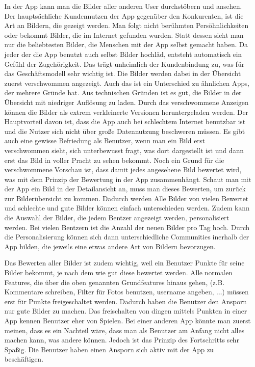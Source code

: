 In der App kann man die Bilder aller anderen User durchstöbern und ansehen. Der hauptsächliche Kundennutzen der App gegenüber den Konkurenten, ist die Art an Bildern, die gezeigt werden. Man folgt nicht berühmten Persöhnlichkeiten oder bekommt Bilder, die im Internet gefunden wurden. Statt dessen sieht man nur die beliebtesten Bilder, die Menschen mit der App selbst gemacht haben. Da jeder der die App benutzt auch selbst Bilder hochläd, entsteht automatisch ein Gefühl der Zugehörigkeit. Das trägt unheimlich der Kundenbindung zu, was für das Geschäftsmodell sehr wichtig ist.
Die Bilder werden dabei in der Übersicht zuerst verschwommen angezeigt. Auch das ist ein Unterschied zu ähnlichen Apps, der mehrere Gründe hat. Aus technischen Gründen ist es gut, die Bilder in der Übersicht mit niedriger Auflösung zu laden. Durch das verschwommene Anzeigen können die Bilder als extrem verkleinerte Versionen heruntergeladen werden. Der Hauptvorteil davon ist, dass die App auch bei schlechtem Internet benutzbar ist und die Nutzer sich nicht über große Datennutzung beschweren müssen. Es gibt auch eine gewisse Befriedung als Benutzer, wenn man ein Bild erst verschwommen sieht, sich unterbewusst fragt, was dort dargestellt ist und dann erst das Bild in voller Pracht zu sehen bekommt. Noch ein Grund für die verschwommene Vorschau ist, dass damit jedes angesehene Bild bewertet wird, was mit dem Prinzip der Bewertung in der App zusammenhängt.
Schaut man mit der App ein Bild in der Detailansicht an, muss man dieses Bewerten, um zurück zur Bilderübersicht zu kommen. Dadurch werden Alle Bilder von vielen Bewertet und schlechte und gute Bilder können einfach unterschieden werden. Zudem kann die Auswahl der Bilder, die jedem Bentzer angezeigt werden, personalisiert werden. Bei vielen Bentzern ist die Anzahl der neuen Bilder pro Tag hoch. Durch die Personalisierung können sich dann unterschiedliche Communities inerhalb der App bilden, die jeweils eine etwas andere Art von Bildern bevorzugen.

Das Bewerten aller Bilder ist zudem wichtig, weil ein Benutzer Punkte für seine Bilder bekommt, je nach dem wie gut diese bewertet werden. Alle normalen Features, die über die oben genannten Grundfeatures hinaus gehen, (z.B. Kommentare schreiben, Filter für Fotos benutzen, username angeben, ...) müssen erst für Punkte freigeschaltet werden. Dadurch haben die Benutzer den Ansporn nur gute Bilder zu machen.
Das freischalten von dingen mittels Punkten in einer App kennen Benutzer eher von Spielen. Bei einer anderen App könnte man zuerst meinen, dass es ein Nachteil wäre, dass man als Benutzer am Anfang nicht alles machen kann, was andere können. Jedoch ist das Prinzip des Fortschritts sehr Spaßig. Die Benutzer haben einen Ansporn sich aktiv mit der App zu beschäftigen.

